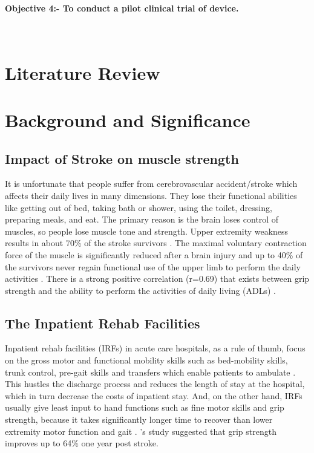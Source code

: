 \documentclass[12pt]{article}
\begin{document}
\paragraph{Objective 4:- To conduct a pilot clinical trial of device.}~\\

\section{Literature Review}

\section {Background and Significance}
\subsection{Impact of Stroke on muscle strength}
It is unfortunate that people suffer from cerebrovascular accident/stroke which affects their daily lives in many dimensions. They lose their functional abilities like getting out of bed, taking bath or shower, using the toilet, dressing, preparing meals, and eat. The primary reason is the brain loses control of muscles, so people lose muscle tone and strength. Upper extremity weakness results in about 70\% of the stroke survivors \cite{rand2015predicting}. The maximal voluntary contraction force of the muscle  is significantly reduced after a brain injury and up to 40\% of the survivors never regain functional use of the upper limb to perform the daily activities \cite{harris2010strength}. There is a strong positive correlation (r=0.69) that exists between grip strength and the ability to perform the activities of daily living (ADLs) \cite{harris2007paretic}.  
\medskip

\subsection{The Inpatient Rehab Facilities}
Inpatient rehab facilities (IRFs) in acute care hospitals, as a rule of thumb, focus on the gross motor and  functional mobility skills such as bed-mobility skills, trunk control, pre-gait skills and transfers which enable patients to ambulate \cite{horn2005stroke}. This hustles the discharge process and reduces the length of stay at the hospital, which in turn decrease the costs of inpatient stay. And, on the other hand, IRFs usually give least input to hand functions such as fine motor skills  and grip strength, because it takes significantly longer time to recover than lower extremity motor function and gait \cite{lee2015six}. \citeauthor{rand2015predicting}'s study suggested that grip strength improves up to 64\% one year post stroke. 
\medskip
\end{document}
